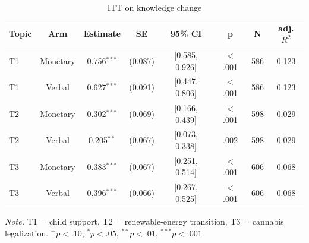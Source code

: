 \begin{table}[htbp]
\centering
\begin{threeparttable}
\caption{ITT on knowledge change}
\label{tab:tab_knowledge_itt}
\begin{tabular}{lccccccc}
\toprule
  Topic & Arm & Estimate & SE & 95\% CI & p & N & adj. $R^2$ \\
\midrule
  T1 & Monetary & 0.756$^{***}$ & (0.087) & [0.585, 0.926] & $<$.001 & 586 & 0.123 \\
  T1 & Verbal & 0.627$^{***}$ & (0.091) & [0.447, 0.806] & $<$.001 & 586 & 0.123 \\
  T2 & Monetary & 0.302$^{***}$ & (0.069) & [0.166, 0.439] & $<$.001 & 598 & 0.029 \\
  T2 & Verbal & 0.205$^{**}$ & (0.067) & [0.073, 0.338] & .002 & 598 & 0.029 \\
  T3 & Monetary & 0.383$^{***}$ & (0.067) & [0.251, 0.514] & $<$.001 & 606 & 0.068 \\
  T3 & Verbal & 0.396$^{***}$ & (0.066) & [0.267, 0.525] & $<$.001 & 606 & 0.068 \\
\bottomrule
\end{tabular}
\begin{tablenotes}\footnotesize\item \textit{Note.} T1 = child support, T2 = renewable-energy transition, T3 = cannabis legalization. $^{+}p<.10$, $^{*}p<.05$, $^{**}p<.01$, $^{***}p<.001$.\end{tablenotes}
\end{threeparttable}
\end{table}
